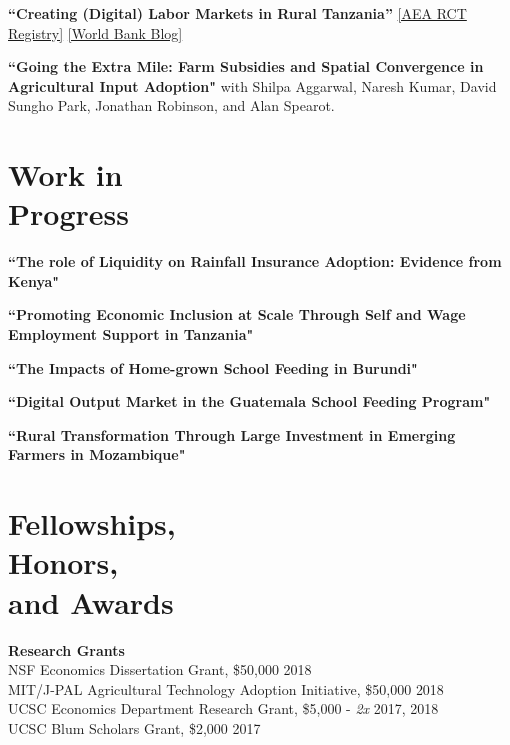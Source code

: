 \documentclass[letterpaper, margin, 10pt]{res} %
\begin{document}
\begin{resume}
{\bf ``{Creating (Digital) Labor Markets in Rural Tanzania}''} \href{https://www.socialscienceregistry.org/trials/4483}{{[AEA RCT Registry]}} \href{https://blogs.worldbank.org/impactevaluations/using-sms-transform-agricultural-labor-markets-tanzania-guest-post-dahyeon-jeong}{{[World Bank Blog]}}


{\bf ``Going the Extra Mile: Farm Subsidies and Spatial Convergence in Agricultural Input Adoption"}
with Shilpa Aggarwal, Naresh Kumar, David Sungho Park, Jonathan Robinson, and Alan Spearot. 


\normalsize\section{\textbf{Work in  \\ Progress}}

{\bf ``The role of Liquidity on Rainfall Insurance Adoption: Evidence from Kenya"}

{\bf ``Promoting Economic Inclusion at Scale Through Self and Wage Employment Support in Tanzania"}

{\bf ``The Impacts of Home-grown School Feeding in Burundi"}

{\bf ``Digital Output Market in the Guatemala School Feeding Program"}

{\bf ``Rural Transformation Through Large Investment in Emerging Farmers in Mozambique"}



\section{\sc \textbf{Fellowships, \\ Honors, \\ and Awards}}
{\bf Research Grants}\\
NSF Economics Dissertation Grant, \$50,000  \hfill{2018}\\
MIT/J-PAL Agricultural Technology Adoption Initiative, \$50,000   \hfill{2018}\\
UCSC Economics Department Research Grant, \$5,000 - \textit{2x}  \hfill{2017, 2018}\\
UCSC Blum Scholars Grant, \$2,000    \hfill{2017}


\end{resume}
\end{document}
